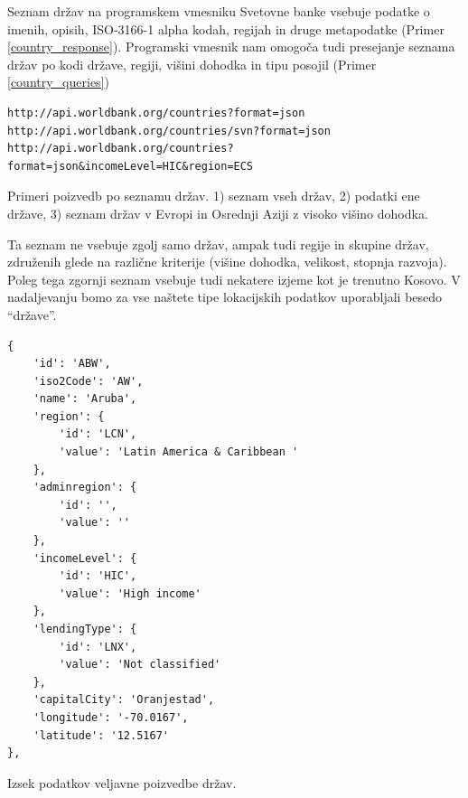 Seznam držav na programskem vmesniku Svetovne banke vsebuje podatke o imenih, 
opisih, ISO-3166-1 alpha kodah, regijah in druge metapodatke 
(Primer \ref{country_response}). Programski
vmesnik nam omogoča tudi presejanje seznama držav po kodi države, regiji,
višini dohodka in tipu posojil (Primer \ref{country_queries})


\begin{snippet}
\begin{center}
\begin{lstlisting}
http://api.worldbank.org/countries?format=json
http://api.worldbank.org/countries/svn?format=json
http://api.worldbank.org/countries?format=json&incomeLevel=HIC&region=ECS
\end{lstlisting}
\end{center}
\caption{Primeri poizvedb po seznamu držav.
1) seznam vseh držav, 2) podatki ene države,
3) seznam držav v Evropi in Osrednji Aziji z visoko višino dohodka.}
\label{country_queries}
\end{snippet} 

Ta seznam ne vsebuje zgolj samo držav, ampak tudi regije in skupine držav, 
združenih glede na različne kriterije (višine dohodka, velikost, stopnja
razvoja). Poleg tega zgornji seznam vsebuje tudi nekatere izjeme kot je trenutno
Kosovo. V nadaljevanju bomo za vse naštete tipe lokacijskih podatkov
uporabljali besedo ``države''. 

\begin{snippet}
\begin{center}
\begin{lstlisting}
{
    'id': 'ABW',
    'iso2Code': 'AW',
    'name': 'Aruba',
    'region': {
        'id': 'LCN',
        'value': 'Latin America & Caribbean '
    },
    'adminregion': {
        'id': '',
        'value': ''
    },
    'incomeLevel': {
        'id': 'HIC',
        'value': 'High income'
    },
    'lendingType': {
        'id': 'LNX',
        'value': 'Not classified'
    },
    'capitalCity': 'Oranjestad',
    'longitude': '-70.0167',
    'latitude': '12.5167'
},
\end{lstlisting}
\end{center}
\caption[some]{Izsek podatkov veljavne poizvedbe držav.}
\label{country_response}
\end{snippet} 


